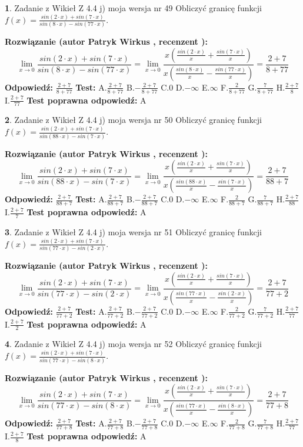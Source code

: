 \documentclass[12pt, a4paper]{article}
\theoremstyle{definition} %
\newtheorem{zad}{}
\newcommand{\zadStart}[1]{\begin{zad}#1\newline}
\newcommand{\zadStop}{\end{zad}}
\newcommand{\rozwStart}[2]{\noindent \textbf{Rozwiązanie (autor #1 , recenzent #2): }\newline}
\newcommand{\rozwStop}{\newline}
\newcommand{\odpStart}{\noindent \textbf{Odpowiedź:}\newline}
\newcommand{\odpStop}{\newline}
\newcommand{\testStart}{\noindent \textbf{Test:}\newline}
\newcommand{\testStop}{\newline}
\newcommand{\kluczStart}{\noindent \textbf{Test poprawna odpowiedź:}\newline}
\newcommand{\kluczStop}{\newline}
\begin{document}
\zadStart{Zadanie z Wikieł Z 4.4 j) moja wersja nr 49}
Obliczyć granicę funkcji $f(x)=\frac{sin(2\cdot x) +sin(7\cdot x)}{sin(8\cdot x) -sin(77\cdot x)}$.
\zadStop
\rozwStart{Patryk Wirkus}{}
$$\lim\limits_{x\to 0}\frac{sin(2\cdot x) +sin(7\cdot x)}{sin(8\cdot x) -sin(77\cdot x)}=\lim\limits_{x\to 0}\frac{x(\frac{sin(2\cdot x)}{x}+\frac{sin(7\cdot x)}{x})}{x(\frac{sin(8\cdot x)}{x}-\frac{sin(77\cdot x)}{x})}=\frac{2+7}{8+77}$$
\rozwStop
\odpStart
$\frac{2+7}{8+77}$
\odpStop
\testStart
A.$\frac{2+7}{8+77}$
B.$-\frac{2+7}{8+77}$
C.$0$
D.$-\infty$
E.$\infty$
F.$\frac{2}{8+77}$
G.$\frac{7}{8+77}$
H.$\frac{2+7}{8}$
I.$\frac{2+7}{77}$
\testStop
\kluczStart
A
\kluczStop



\zadStart{Zadanie z Wikieł Z 4.4 j) moja wersja nr 50}
Obliczyć granicę funkcji $f(x)=\frac{sin(2\cdot x) +sin(7\cdot x)}{sin(88\cdot x) -sin(7\cdot x)}$.
\zadStop
\rozwStart{Patryk Wirkus}{}
$$\lim\limits_{x\to 0}\frac{sin(2\cdot x) +sin(7\cdot x)}{sin(88\cdot x) -sin(7\cdot x)}=\lim\limits_{x\to 0}\frac{x(\frac{sin(2\cdot x)}{x}+\frac{sin(7\cdot x)}{x})}{x(\frac{sin(88\cdot x)}{x}-\frac{sin(7\cdot x)}{x})}=\frac{2+7}{88+7}$$
\rozwStop
\odpStart
$\frac{2+7}{88+7}$
\odpStop
\testStart
A.$\frac{2+7}{88+7}$
B.$-\frac{2+7}{88+7}$
C.$0$
D.$-\infty$
E.$\infty$
F.$\frac{2}{88+7}$
G.$\frac{7}{88+7}$
H.$\frac{2+7}{88}$
I.$\frac{2+7}{7}$
\testStop
\kluczStart
A
\kluczStop



\zadStart{Zadanie z Wikieł Z 4.4 j) moja wersja nr 51}
Obliczyć granicę funkcji $f(x)=\frac{sin(2\cdot x) +sin(7\cdot x)}{sin(77\cdot x) -sin(2\cdot x)}$.
\zadStop
\rozwStart{Patryk Wirkus}{}
$$\lim\limits_{x\to 0}\frac{sin(2\cdot x) +sin(7\cdot x)}{sin(77\cdot x) -sin(2\cdot x)}=\lim\limits_{x\to 0}\frac{x(\frac{sin(2\cdot x)}{x}+\frac{sin(7\cdot x)}{x})}{x(\frac{sin(77\cdot x)}{x}-\frac{sin(2\cdot x)}{x})}=\frac{2+7}{77+2}$$
\rozwStop
\odpStart
$\frac{2+7}{77+2}$
\odpStop
\testStart
A.$\frac{2+7}{77+2}$
B.$-\frac{2+7}{77+2}$
C.$0$
D.$-\infty$
E.$\infty$
F.$\frac{2}{77+2}$
G.$\frac{7}{77+2}$
H.$\frac{2+7}{77}$
I.$\frac{2+7}{2}$
\testStop
\kluczStart
A
\kluczStop



\zadStart{Zadanie z Wikieł Z 4.4 j) moja wersja nr 52}
Obliczyć granicę funkcji $f(x)=\frac{sin(2\cdot x) +sin(7\cdot x)}{sin(77\cdot x) -sin(8\cdot x)}$.
\zadStop
\rozwStart{Patryk Wirkus}{}
$$\lim\limits_{x\to 0}\frac{sin(2\cdot x) +sin(7\cdot x)}{sin(77\cdot x) -sin(8\cdot x)}=\lim\limits_{x\to 0}\frac{x(\frac{sin(2\cdot x)}{x}+\frac{sin(7\cdot x)}{x})}{x(\frac{sin(77\cdot x)}{x}-\frac{sin(8\cdot x)}{x})}=\frac{2+7}{77+8}$$
\rozwStop
\odpStart
$\frac{2+7}{77+8}$
\odpStop
\testStart
A.$\frac{2+7}{77+8}$
B.$-\frac{2+7}{77+8}$
C.$0$
D.$-\infty$
E.$\infty$
F.$\frac{2}{77+8}$
G.$\frac{7}{77+8}$
H.$\frac{2+7}{77}$
I.$\frac{2+7}{8}$
\testStop
\kluczStart
A
\kluczStop
\end{document}
